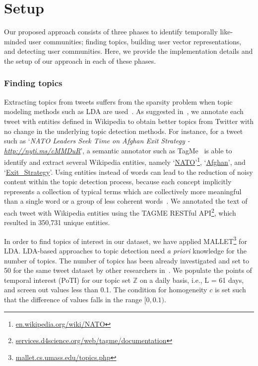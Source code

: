 \documentclass[sigconf]{acmart}
\begin{document}
\section{Setup}
Our proposed approach consists of three phases to identify temporally like-minded user communities; finding topics, building user vector representations, and detecting user communities. Here, we provide the implementation details and the setup of our approach in each of these phases.


\subsubsection{Finding topics}
Extracting topics from tweets suffers from the sparsity problem when topic modeling methods such as LDA are used~\cite{escri/ZarrinkalamB17}. As suggested in~\cite{DBLP:conf/ecir/ZarrinkalamFBK17, DBLP:conf/ecir/ZarrinkalamFBK16}, we annotate each tweet with entities defined in Wikipedia to obtain better topics from Twitter with no change in the underlying topic detection methods. For instance, for a tweet such as `\textit{NATO Leaders Seek Time on Afghan Exit Strategy - \href{http://nyti.ms/cMMDuR}{http://nyti.ms/cMMDuR}}', a semantic annotator such as TagMe~\cite{DBLP:conf/cikm/FerraginaS10} is able to identify and extract several Wikipedia entities, namely `\href{https://en.wikipedia.org/wiki/NATO}{NATO}'\footnote{\href{https://en.wikipedia.org/wiki/NATO}{en.wikipedia.org/wiki/NATO}}, `\href{https://en.wikipedia.org/wiki/Afghanistan}{Afghan}', and `\href{https://en.wikipedia.org/wiki/Exit_strategy}{Exit\_Strategy}'. Using entities instead of words can lead to the reduction of noisy content within the topic detection process, because each concept implicitly represents a collection of typical terms which are collectively more meaningful than a single word or a group of less coherent words~\cite{DBLP:conf/wims/PetkosPASK14}. We annotated the text of each tweet with Wikipedia entities using the TAGME RESTful API\footnote{\href{https://services.d4science.org/web/tagme/documentation}{services.d4science.org/web/tagme/documentation}}, which resulted in 350,731 unique entities.

In order to find topics of interest in our dataset, we have applied MALLET\footnote{\href{http://mallet.cs.umass.edu/topics.php}{mallet.cs.umass.edu/topics.php}} for LDA. LDA-based approaches to topic detection need \textit{a priori} knowledge for the number of topics. The number of topics has been already investigated and set to 50 for the same tweet dataset by other researchers in~\cite{DBLP:journals/ci/FaniBZZD17}. We populate the points of temporal interest (PoTI) for our topic set $\mathbb{Z}$ on a daily basis, i.e., L = 61 days, and screen out values less than 0.1. The condition for homogeneity $c$ is set such that the difference of values falls in the range $[0, 0.1)$.
\end{document}
